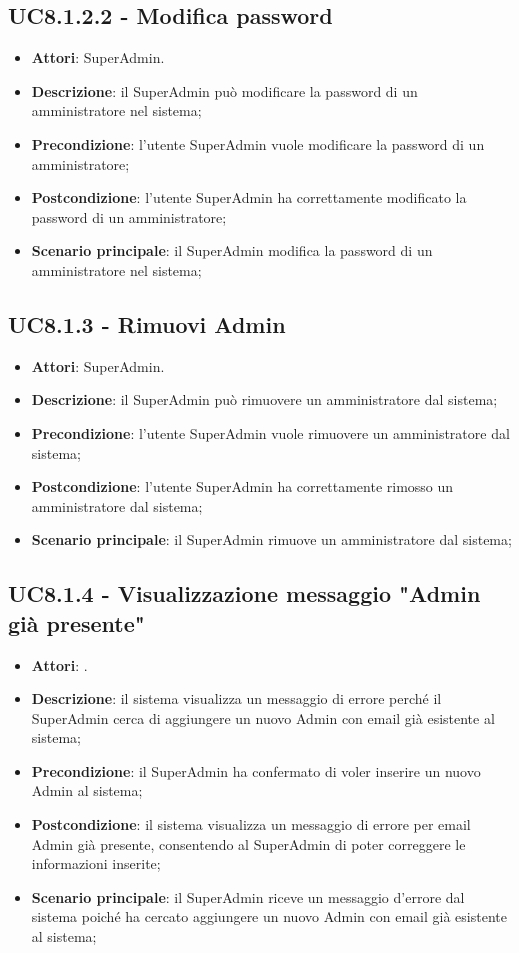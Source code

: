 \documentclass[../AnalisiDeiRequisiti_v4.0.0.tex]{subfiles}
\begin{document}
\subsection{UC8.1.2.2 - Modifica password} 
\label{sssec:UC8.1.2.2} 
\begin{itemize} 
\item \textbf{Attori}: SuperAdmin.
\item \textbf{Descrizione}: il SuperAdmin può modificare la password di un amministratore nel sistema;
\item \textbf{Precondizione}: l'utente SuperAdmin vuole modificare la password di un amministratore;
\item \textbf{Postcondizione}: l'utente SuperAdmin ha correttamente  modificato la password di un amministratore;
\item \textbf{Scenario principale}: il SuperAdmin modifica la password di un amministratore nel sistema;
\end{itemize} 
\subsection{UC8.1.3 - Rimuovi Admin} 
\label{sssec:UC8.1.3} 
\begin{itemize} 
\item \textbf{Attori}: SuperAdmin.
\item \textbf{Descrizione}: il SuperAdmin può rimuovere un amministratore dal sistema;
\item \textbf{Precondizione}: l'utente SuperAdmin vuole rimuovere un amministratore dal sistema;
\item \textbf{Postcondizione}: l'utente SuperAdmin ha correttamente  rimosso un amministratore dal sistema;
\item \textbf{Scenario principale}: il SuperAdmin rimuove un amministratore dal sistema;

\end{itemize} 
\subsection{UC8.1.4 - Visualizzazione messaggio "Admin già presente"} 
\label{sssec:UC8.1.4} 
\begin{itemize} 
\item \textbf{Attori}: .
\item \textbf{Descrizione}: il sistema visualizza un messaggio di errore perché il SuperAdmin cerca di aggiungere un nuovo Admin con email già esistente al sistema;
\item \textbf{Precondizione}: il SuperAdmin ha confermato di voler inserire un nuovo Admin al sistema;
\item \textbf{Postcondizione}: il sistema visualizza un messaggio di errore per email Admin già presente, consentendo al SuperAdmin di poter correggere le informazioni inserite;
\item \textbf{Scenario principale}: il SuperAdmin riceve un messaggio d'errore dal sistema poiché ha cercato aggiungere un nuovo Admin con email già esistente al sistema;
\end{itemize} 
\end{document}
